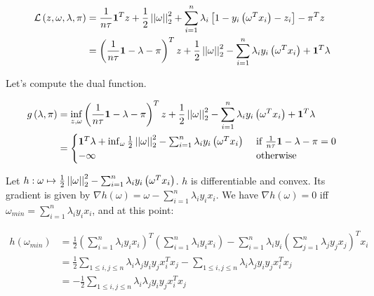 \documentclass[a4paper, 11pt]{report}
\begin{document}
\begin{enumerate}
    \begin{equation*}
        \begin{aligned}
        \mathcal{L} \left( z, \omega, \lambda, \pi \right) &= \frac{1}{n \tau} \mathbf{1}^{T} z + \frac{1}{2} \left|\left| \omega \right|\right|_{2}^{2} + \sum_{i=1}^{n} \lambda_{i} \left[ 1 - y_{i} \left( \omega^{T} x_{i} \right) - z_{i} \right] - \pi^{T} z \\
        &= \left( \frac{1}{n \tau} \mathbf{1} - \lambda - \pi \right)^{T} z + \frac{1}{2} \left|\left| \omega \right|\right|_{2}^{2} - \sum_{i=1}^{n} \lambda_{i} y_{i} \left( \omega^{T} x_{i} \right) + \mathbf{1}^{T} \lambda
        \end{aligned}
    \end{equation*}
    
    Let's compute the dual function.
    
    \begin{equation*}
        \begin{aligned}
        g \left( \lambda, \pi \right) &= \inf_{z, \omega} \left( \frac{1}{n \tau} \mathbf{1} - \lambda - \pi \right)^{T} z + \frac{1}{2} \left|\left| \omega \right|\right|_{2}^{2} - \sum_{i=1}^{n} \lambda_{i} y_{i} \left( \omega^{T} x_{i} \right) + \mathbf{1}^{T} \lambda \\
        &= \begin{cases}
        \mathbf{1}^{T} \lambda + \inf_{\omega} \frac{1}{2} \left|\left| \omega \right|\right|_{2}^{2} - \sum_{i=1}^{n} \lambda_{i} y_{i} \left( \omega^{T} x_{i} \right) & \text{ if } \frac{1}{n \tau} \mathbf{1} - \lambda - \pi = 0 \\
        - \infty & \text{ otherwise }
        \end{cases}
        \end{aligned}
    \end{equation*}
    
    Let $h: \omega \mapsto \frac{1}{2} \left|\left| \omega \right|\right|_{2}^{2} - \sum_{i=1}^{n} \lambda_{i} y_{i} \left( \omega^{T} x_{i} \right)$. $h$ is differentiable and convex. Its gradient is given by $\nabla h(\omega) = \omega - \sum_{i=1}^{n} \lambda_{i} y_{i} x_{i}$. We have $\nabla h(\omega) = 0$ iff $\omega_{min} = \sum_{i=1}^{n} \lambda_{i} y_{i} x_{i}$, and at this point:
    
    \begin{equation*}
        \begin{aligned}
        h \left( \omega_{min} \right) &= \frac{1}{2} \left( \sum_{i=1}^{n} \lambda_{i} y_{i} x_{i} \right)^{T} \left( \sum_{i=1}^{n} \lambda_{i} y_{i} x_{i} \right) - \sum_{i=1}^{n} \lambda_{i} y_{i} \left( \sum_{j=1}^{n} \lambda_{j} y_{j} x_{j} \right)^{T} x_{i} \\
        &= \frac{1}{2} \sum_{1 \leq i, j \leq n} \lambda_{i} \lambda_{j} y_{i} y_{j} x_{i}^{T} x_{j} - \sum_{1 \leq i, j \leq n} \lambda_{i} \lambda_{j} y_{i} y_{j} x_{i}^{T} x_{j} \\
        &= - \frac{1}{2} \sum_{1 \leq i, j \leq n} \lambda_{i} \lambda_{j} y_{i} y_{j} x_{i}^{T} x_{j}
        \end{aligned}
    \end{equation*}
    

\end{enumerate}
\end{document}
